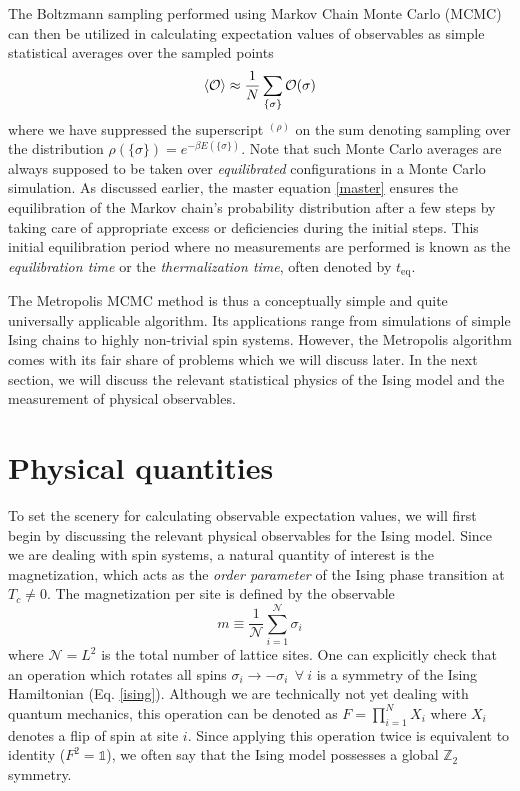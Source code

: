 \documentclass[../thesis_main.tex]{subfiles}
\begin{document}
The Boltzmann sampling performed using Markov Chain Monte Carlo (MCMC) can then be utilized in calculating expectation values of observables as simple statistical averages over the sampled points
\begin{equation}
    \expval{\mathcal{O}} \approx \frac{1}{N} \sum_{\{\sigma\}} \mathcal{O(\sigma)}
\end{equation}
where we have suppressed the superscript ${}^{(\rho)}$ on the sum denoting sampling over the distribution $\rho(\{\sigma\}) = e^{-\beta E(\{\sigma\})}$. Note that such Monte Carlo averages are always supposed to be taken over \textit{equilibrated} configurations in a Monte Carlo simulation. As discussed earlier, the master equation \eqref{master} ensures the equilibration of the Markov chain's probability distribution after a few steps by taking care of appropriate excess or deficiencies during the initial steps. This initial equilibration period where no measurements are performed is known as the \textit{equilibration time} or the \textit{thermalization time}, often denoted by $t_\text{eq}$.

The Metropolis MCMC method is thus a conceptually simple and quite universally applicable algorithm. Its applications range from simulations of simple Ising chains to highly non-trivial spin systems. However, the Metropolis algorithm comes with its fair share of problems which we will discuss later. In the next section, we will discuss the relevant statistical physics of the Ising model and the measurement of physical observables.

\section{Physical quantities}
To set the scenery for calculating observable expectation values, we will first begin by discussing the relevant physical observables for the Ising model. Since we are dealing with spin systems, a natural quantity of interest is the magnetization, which acts as the \textit{order parameter} of the Ising phase transition at $T_c \neq 0$. The magnetization per site is defined by the observable
\begin{equation}
    m \equiv \frac{1}{\mathcal{N}} \sum_{i=1}^{\mathcal{N}} \sigma_i
\end{equation} 
where $\mathcal{N}=L^2$ is the total number of lattice sites. One can explicitly check that an operation which rotates all spins $\sigma_i \to -\sigma_i \:\: \forall \: i$ is a symmetry of the Ising Hamiltonian (Eq. \eqref{ising}). Although we are technically not yet dealing with quantum mechanics, this operation can be denoted as $F = \prod_{i=1}^N X_i$ where $X_i$ denotes a flip of spin at site $i$. Since applying this operation twice is equivalent to identity ($F^2 = \mathds{1}$), we often say that the Ising model possesses a global $\mathbb{Z}_2$ symmetry.
\end{document}
